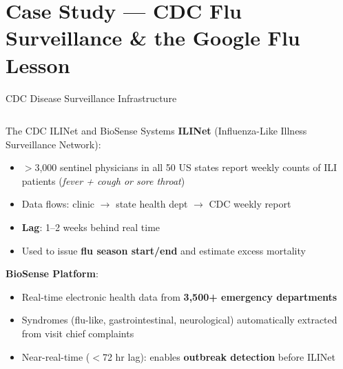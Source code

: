 \documentclass[aspectratio=169,10pt]{beamer}
\begin{document}
\section{Case Study — CDC Flu Surveillance \& the Google Flu Lesson}

\begin{frame}{CDC Disease Surveillance Infrastructure}
  \begin{columns}[T]
      \begin{block}{The CDC ILINet and BioSense Systems}
        \textbf{ILINet} (Influenza-Like Illness Surveillance Network):
        \begin{itemize}
          \item $>$3{,}000 sentinel physicians in all 50 US states
                report weekly counts of ILI patients
                (\textit{fever + cough or sore throat})
          \item Data flows: clinic $\to$ state health dept $\to$
                CDC weekly report
          \item \textbf{Lag}: 1--2 weeks behind real time
          \item Used to issue \textbf{flu season start/end} and
                estimate excess mortality
        \end{itemize}
        \textbf{BioSense Platform}:
        \begin{itemize}
          \item Real-time electronic health data from
                \textbf{3{,}500+ emergency departments}
          \item Syndromes (flu-like, gastrointestinal, neurological)
                automatically extracted from visit chief complaints
          \item Near-real-time ($<$72 hr lag): enables
                \textbf{outbreak detection} before ILINet
        \end{itemize}
      \end{block}

      \begin{center}
\end{center}
\end{columns}
\end{frame}
\end{document}
